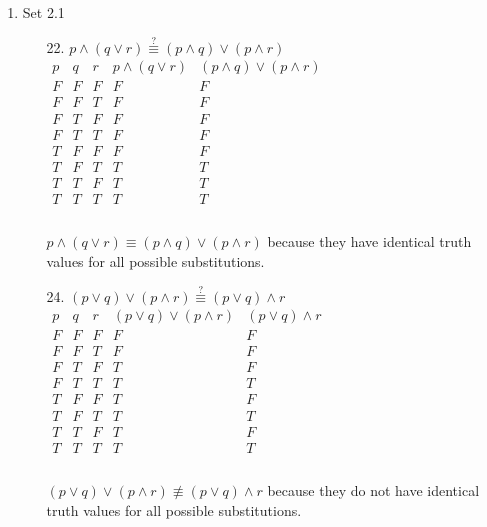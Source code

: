 \documentclass[letterpaper]{article}
\begin{document}
\begin{enumerate}
\begin{enumerate}
			\item Set 2.1 
			\begin{itemize}
				\item [22.]
				$p \wedge  \left( q \vee r \right) \stackrel{?}{\equiv} \left( p \wedge q \right) \vee \left( p \wedge r \right)$ \\
				$\begin{array}{c|c|c|c|c}
					p & q & r & p \wedge  \left( q \vee r \right) & \left( p \wedge q \right) \vee \left( p \wedge r \right) \\ \hline
					F & F & F & F & F \\ \hline
					F & F & T & F & F \\ \hline
					F & T & F & F & F \\ \hline
					F & T & T & F & F \\ \hline
					T & F & F & F & F \\ \hline
					T & F & T & T & T \\ \hline
					T & T & F & T & T \\ \hline
					T & T & T & T & T \\ 
				\end{array}$ \\
				\\
				$p \wedge \left( q \vee r \right) \equiv \left( p \wedge q \right) \vee \left( p \wedge r \right)$ because they have identical truth values for all possible substitutions.
				\item [24.]
				$\left( p \vee q \right) \vee \left( p \wedge r \right) \stackrel{?}{\equiv} \left( p \vee q \right) \wedge r$ \\
				$\begin{array}{c|c|c|c|c}
					p & q & r & \left( p \vee q \right) \vee \left( p \wedge r \right) & \left( p \vee q \right) \wedge r \\ \hline
					F & F & F & F & F \\ \hline
					F & F & T & F & F \\ \hline
					F & T & F & T & F \\ \hline
					F & T & T & T & T \\ \hline
					T & F & F & T & F \\ \hline
					T & F & T & T & T \\ \hline
					T & T & F & T & F \\ \hline
					T & T & T & T & T \\ 
				\end{array}$ \\
				\\
				$\left( p \vee q \right) \vee \left( p \wedge r \right) \not\equiv \left( p \vee q \right) \wedge r$ because they do not have identical truth values for all possible substitutions.
			\end{itemize}
		

\end{enumerate}
\end{enumerate}
\end{document}
